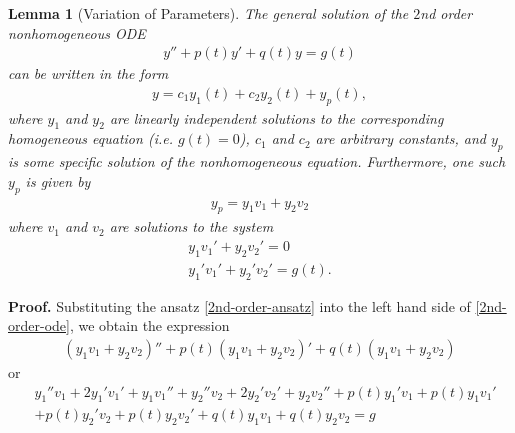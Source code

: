 \documentclass[12pt,reqno]{amsart}
\numberwithin{equation}{section}  %
\newtheorem{lemma}[theorem]{Lemma}
\begin{document}
\begin{lemma}[Variation of Parameters]
\label{lem:nonhomog-ode-soln}
The general solution of the $2$nd order nonhomogeneous ODE 
%
%
\begin{equation}
  \label{2nd-order-ode}
\begin{split}
y'' + p(t)y' + q(t)y = g(t)
\end{split}
\end{equation}
%
%
can be written in the form
%
%
\begin{equation*}
\begin{split}
  y = c_{1}y_{1}(t) + c_{2}y_{2}(t) + y_{p}(t),
\end{split}
\end{equation*}
%
%
where $y_{1}$ and $y_{2}$ are linearly independent solutions to the
corresponding homogeneous equation (i.e. $g(t) = 0$), $c_{1}$ and $c_{2}$ are
arbitrary constants, and $y_{p}$ is some specific solution of the nonhomogeneous
equation. Furthermore, one such $y_{p}$ is given by
%
%
\begin{equation}
  \label{2nd-order-ansatz}
\begin{split}
  y_{p} = y_{1}v_{1} + y_{2} v_{2}
\end{split}
\end{equation}
%
%
where $v_{1}$ and $v_{2}$ are solutions to the system
\begin{gather}
  \label{cancel-rel-1}
  y_{1} v_{1}' + y_{2} v_{2}' = 0
  \\
  \label{cancel-rel-2}
  y_{1}' v_{1}' + y_{2}' v_{2}' = g(t).
\end{gather}
\end{lemma}
%
{\bf Proof.} Substituting the ansatz \eqref{2nd-order-ansatz} into
the left hand side of \eqref{2nd-order-ode}, we obtain the expression
%
%
%
%
\begin{equation*}
\begin{split}
  (y_{1}v_{1} + y_{2}v_{2})'' + p(t)(y_{1}v_{1} + y_{2}v_{2})' +
  q(t)(y_{1}v_{1} + y_{2}v_{2}) 
\end{split}
\end{equation*}
%
%
or
%
%
\begin{equation*}
  \begin{split}
    & y_{1}'' v_{1} + 2y_{1}'v_{1}' + y_{1}v_{1}'' + y_{2}''v_{2} + 2y_{2}' v_{2}'
  + y_{2} v_{2}'' + p(t)y_{1}'v_{1} + p(t)y_{1}v_{1}'
  \\
  & + p(t)y_{2}'v_{2} + p(t)y_{2}v_{2}' + q(t)y_{1}v_{1} + q(t)y_{2}v_{2} =g
\end{split}
\end{equation*}
\end{document}
